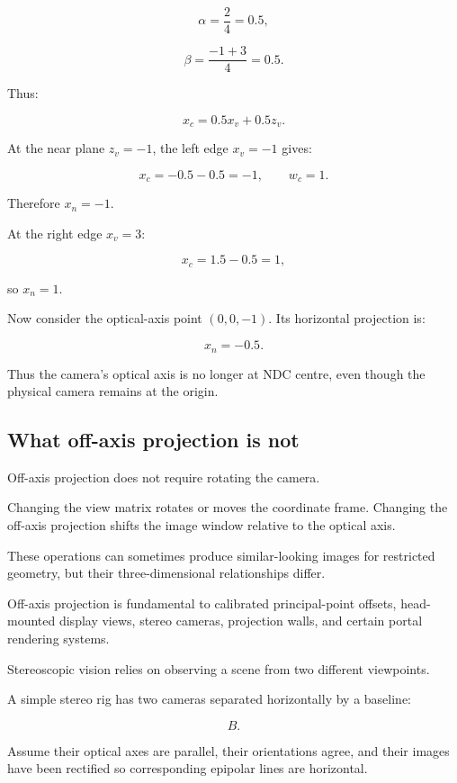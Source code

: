\[ \alpha=\frac{2}{4}=0.5, \]

\[ \beta=\frac{-1+3}{4}=0.5. \]

Thus:

\[ x_c=0.5x_v+0.5z_v. \]

At the near plane \(z_v=-1\), the left edge \(x_v=-1\) gives:

\[ x_c=-0.5-0.5=-1,\qquad w_c=1. \]

Therefore \(x_n=-1\).

At the right edge \(x_v=3\):

\[ x_c=1.5-0.5=1, \]

so \(x_n=1\).

Now consider the optical-axis point \((0,0,-1)\). Its horizontal projection is:

\[ x_n=-0.5. \]

Thus the camera's optical axis is no longer at NDC centre, even though the physical camera remains at the origin.

\subsection{What off-axis projection is not}\label{02-foundations-ii-ch035-what-off-axis-projection-is-not}

\hypertarget{02-foundations-ii-ch035-what-off-axis-projection-is-not}{}

Off-axis projection does not require rotating the camera.

Changing the view matrix rotates or moves the coordinate frame. Changing the off-axis projection shifts the image window relative to the optical axis.

These operations can sometimes produce similar-looking images for restricted geometry, but their three-dimensional relationships differ.

Off-axis projection is fundamental to calibrated principal-point offsets, head-mounted display views, stereo cameras, projection walls, and certain portal rendering systems.

Stereoscopic vision relies on observing a scene from two different viewpoints.

A simple stereo rig has two cameras separated horizontally by a baseline:

\[ \boxed{B}. \]

Assume their optical axes are parallel, their orientations agree, and their images have been rectified so corresponding epipolar lines are horizontal.

